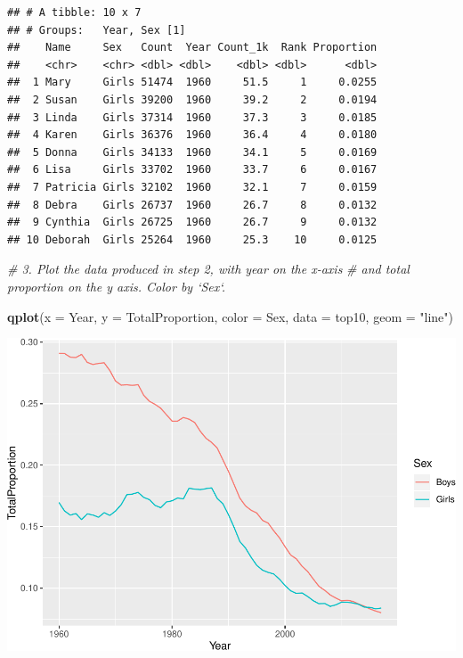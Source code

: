 \documentclass[]{book}
\newenvironment{Shaded}{\begin{snugshade}}{\end{snugshade}}
\newcommand{\CommentTok}[1]{\textcolor[rgb]{0.56,0.35,0.01}{\textit{#1}}}
\newcommand{\DataTypeTok}[1]{\textcolor[rgb]{0.13,0.29,0.53}{#1}}
\newcommand{\KeywordTok}[1]{\textcolor[rgb]{0.13,0.29,0.53}{\textbf{#1}}}
\newcommand{\NormalTok}[1]{#1}
\newcommand{\OperatorTok}[1]{\textcolor[rgb]{0.81,0.36,0.00}{\textbf{#1}}}
\newcommand{\StringTok}[1]{\textcolor[rgb]{0.31,0.60,0.02}{#1}}
\begin{document}
\begin{verbatim}
## # A tibble: 10 x 7
## # Groups:   Year, Sex [1]
##    Name     Sex   Count  Year Count_1k  Rank Proportion
##    <chr>    <chr> <dbl> <dbl>    <dbl> <dbl>      <dbl>
##  1 Mary     Girls 51474  1960     51.5     1     0.0255
##  2 Susan    Girls 39200  1960     39.2     2     0.0194
##  3 Linda    Girls 37314  1960     37.3     3     0.0185
##  4 Karen    Girls 36376  1960     36.4     4     0.0180
##  5 Donna    Girls 34133  1960     34.1     5     0.0169
##  6 Lisa     Girls 33702  1960     33.7     6     0.0167
##  7 Patricia Girls 32102  1960     32.1     7     0.0159
##  8 Debra    Girls 26737  1960     26.7     8     0.0132
##  9 Cynthia  Girls 26725  1960     26.7     9     0.0132
## 10 Deborah  Girls 25264  1960     25.3    10     0.0125
\end{verbatim}

\begin{Shaded}
\end{Shaded}

\begin{Shaded}
\begin{Highlighting}[]
\CommentTok{# 3.  Plot the data produced in step 2, with year on the x-axis}
\CommentTok{#     and total proportion on the y axis. Color by `Sex`.}

\KeywordTok{qplot}\NormalTok{(}\DataTypeTok{x =}\NormalTok{ Year, }
      \DataTypeTok{y =}\NormalTok{ TotalProportion, }
      \DataTypeTok{color =}\NormalTok{ Sex,}
      \DataTypeTok{data =}\NormalTok{ top10,}
      \DataTypeTok{geom =} \StringTok{"line"}\NormalTok{)}
\end{Highlighting}
\end{Shaded}

\includegraphics{R/Rintro/figures/unnamed-chunk-77-1.pdf}
\end{document}
